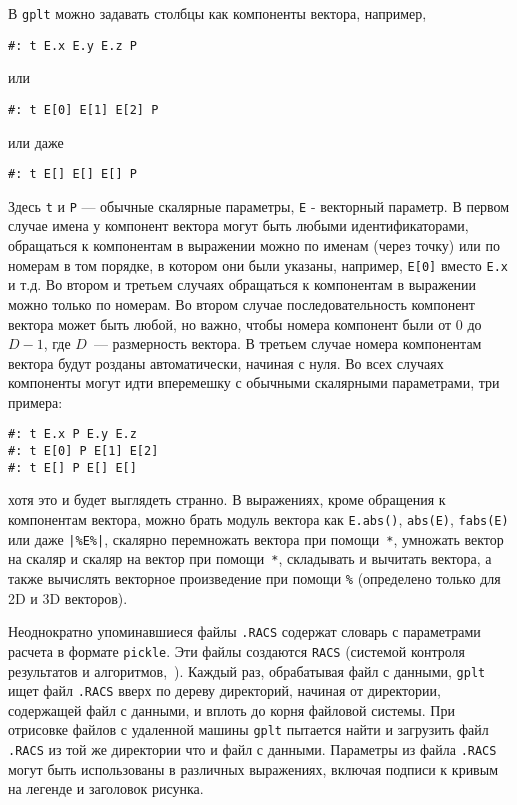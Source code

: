 \documentclass[12pt]{article}
\def\gplt{{\tt gplt}}
\begin{document}
В \gplt{} можно задавать столбцы как компоненты вектора, например,
\begin{verbatim}
#: t E.x E.y E.z P 
\end{verbatim}
или
\begin{verbatim}
#: t E[0] E[1] E[2] P 
\end{verbatim}
или даже
\begin{verbatim}
#: t E[] E[] E[] P 
\end{verbatim}
Здесь \verb't' и \verb'P' --- обычные скалярные параметры, \verb'E' - векторный параметр.
В первом случае имена у компонент вектора могут быть любыми идентификаторами, обращаться к компонентам в выражении можно
по именам (через точку) или по номерам в том порядке, в котором они были указаны, например, \verb'E[0]' вместо \verb'E.x' и т.д.
Во втором и третьем случаях обращаться к компонентам в выражении можно только по номерам.
Во втором случае последовательность компонент
 вектора может быть любой, но важно, чтобы номера компонент были от $0$ до $D-1$, где $D$~--- размерность вектора. В третьем случае
 номера компонентам вектора будут розданы автоматически, начиная с нуля.
Во всех случаях компоненты могут идти вперемешку с обычными скалярными параметрами, три примера:
\begin{verbatim}
#: t E.x P E.y E.z  
#: t E[0] P E[1] E[2]
#: t E[] P E[] E[]  
\end{verbatim}
хотя это и будет выглядеть странно.
В выражениях, кроме обращения к компонентам вектора, можно брать модуль вектора как \verb'E.abs()', \verb'abs(E)',  \verb'fabs(E)' или даже  \verb'|%E%|',
скалярно перемножать вектора при помощи~\verb'*',
умножать вектор на скаляр и скаляр на вектор при помощи~\verb'*', складывать и вычитать вектора, а также вычислять векторное произведение при помощи \verb'%'
(определено только для 2D и 3D векторов).

Неоднократно упоминавшиеся файлы \verb'.RACS' содержат словарь с параметрами расчета в формате \verb'pickle'.
Эти файлы создаются \verb'RACS' (системой контроля результатов и алгоритмов,~\cite{aiwlib:SR:PP2018}).
Каждый раз, обрабатывая файл с данными, \gplt{} ищет файл \verb'.RACS' вверх по дереву директорий, начиная от директории, содержащей файл с данными,
и вплоть до корня файловой системы. При отрисовке файлов с удаленной машины \gplt{} пытается найти и загрузить файл \verb'.RACS' из той же директории что и 
файл с данными. Параметры из файла \verb'.RACS' могут быть использованы в различных выражениях, включая подписи к кривым на легенде и
заголовок рисунка.
\end{document}
